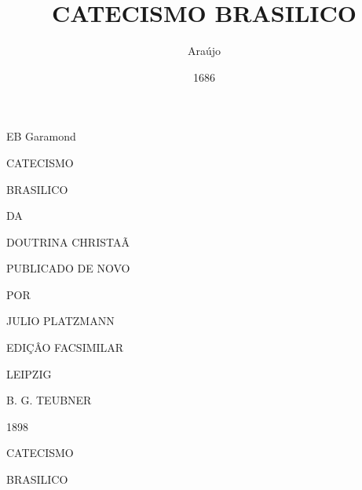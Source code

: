 \documentclass[openany,titlepage,12pt]{book}
\title{CATECISMO BRASILICO}
\author{Araújo}
\date{1686}
\begin{document}
\setmainfont[Ligatures=Historic]
{EB Garamond}
\maketitle

\begin{titlepage}
    \begin{center}
        CATECISMO
        \vspace*{15pt}

        {\huge BRASILICO}
        \vspace*{15pt}

        {\tiny DA}
        \vspace*{15pt}

        DOUTRINA CHRISTAÃ
        \vspace*{15pt}

        {\tiny PUBLICADO DE NOVO} 
        \vspace*{15pt}

        {\tiny POR}
        \vspace*{15pt}

        JULIO PLATZMANN
        \vspace*{15pt}

        {\tiny EDIÇÂO FACSIMILAR}
        \vspace*{60pt}

        {\tiny LEIPZIG
        \vspace*{15pt}

        B. G. TEUBNER
        \vspace*{15pt}

        1898}

    \end{center}  
    \clearpage
\end{titlepage}

\begin{center}
    \vspace*{20pt}
    {\huge CATECISMO}
    \vspace*{20pt}

    {\large BRASILICO}
\end{center}
\pagebreak
\end{document}
